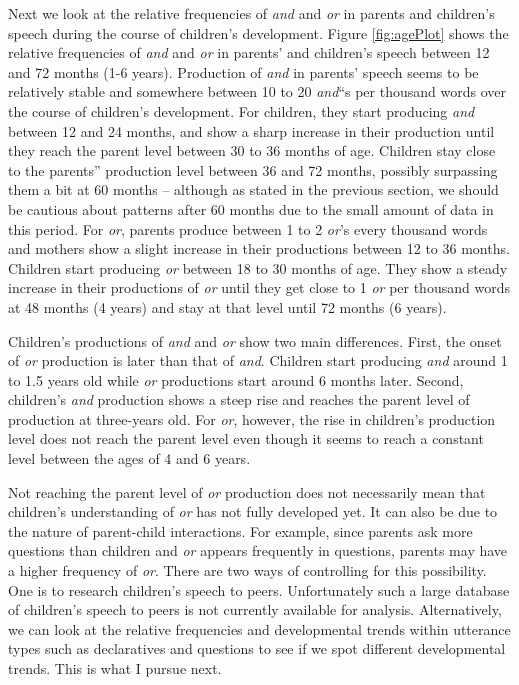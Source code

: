 \documentclass[floatsintext,man]{apa6}
\theoremstyle{definition}
\theoremstyle{definition}
\theoremstyle{definition}
\theoremstyle{remark}
\begin{document}
Next we look at the relative frequencies of \emph{and} and \emph{or} in
parents and children's speech during the course of children's
development. Figure \ref{fig:agePlot} shows the relative frequencies of
\emph{and} and \emph{or} in parents' and children's speech between 12
and 72 months (1-6 years). Production of \emph{and} in parents' speech
seems to be relatively stable and somewhere between 10 to 20
\emph{and}\enquote{s per thousand words over the course of children's
development. For children, they start producing \emph{and} between 12
and 24 months, and show a sharp increase in their production until they
reach the parent level between 30 to 36 months of age. Children stay
close to the parents} production level between 36 and 72 months,
possibly surpassing them a bit at 60 months -- although as stated in the
previous section, we should be cautious about patterns after 60 months
due to the small amount of data in this period. For \emph{or}, parents
produce between 1 to 2 \emph{or}'s every thousand words and mothers show
a slight increase in their productions between 12 to 36 months. Children
start producing \emph{or} between 18 to 30 months of age. They show a
steady increase in their productions of \emph{or} until they get close
to 1 \emph{or} per thousand words at 48 months (4 years) and stay at
that level until 72 months (6 years).

Children's productions of \emph{and} and \emph{or} show two main
differences. First, the onset of \emph{or} production is later than that
of \emph{and}. Children start producing \emph{and} around 1 to 1.5 years
old while \emph{or} productions start around 6 months later. Second,
children's \emph{and} production shows a steep rise and reaches the
parent level of production at three-years old. For \emph{or}, however,
the rise in children's production level does not reach the parent level
even though it seems to reach a constant level between the ages of 4 and
6 years.

Not reaching the parent level of \emph{or} production does not
necessarily mean that children's understanding of \emph{or} has not
fully developed yet. It can also be due to the nature of parent-child
interactions. For example, since parents ask more questions than
children and \emph{or} appears frequently in questions, parents may have
a higher frequency of \emph{or}. There are two ways of controlling for
this possibility. One is to research children's speech to peers.
Unfortunately such a large database of children's speech to peers is not
currently available for analysis. Alternatively, we can look at the
relative frequencies and developmental trends within utterance types
such as declaratives and questions to see if we spot different
developmental trends. This is what I pursue next. \newline
\end{document}
